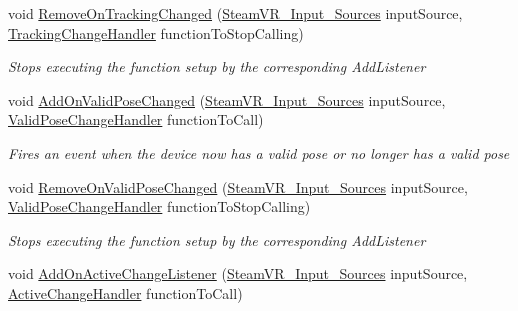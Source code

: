 \begin{DoxyCompactItemize}
void \mbox{\hyperlink{class_valve_1_1_v_r_1_1_steam_v_r___action___pose_a2683c19d679fb0e5ddf4c05ea9f5520e}{Remove\+On\+Tracking\+Changed}} (\mbox{\hyperlink{namespace_valve_1_1_v_r_a82e5bf501cc3aa155444ee3f0662853f}{Steam\+V\+R\+\_\+\+Input\+\_\+\+Sources}} input\+Source, \mbox{\hyperlink{class_valve_1_1_v_r_1_1_steam_v_r___action___pose_a52e352705659c14685cf8a88ef4bafd6}{Tracking\+Change\+Handler}} function\+To\+Stop\+Calling)
\begin{DoxyCompactList}\small\item\em Stops executing the function setup by the corresponding Add\+Listener \end{DoxyCompactList}\item 
void \mbox{\hyperlink{class_valve_1_1_v_r_1_1_steam_v_r___action___pose_a0f4a6917e9c8d7b74c7284c29c6589a8}{Add\+On\+Valid\+Pose\+Changed}} (\mbox{\hyperlink{namespace_valve_1_1_v_r_a82e5bf501cc3aa155444ee3f0662853f}{Steam\+V\+R\+\_\+\+Input\+\_\+\+Sources}} input\+Source, \mbox{\hyperlink{class_valve_1_1_v_r_1_1_steam_v_r___action___pose_a742270a6bddfea2afd7f535378ae7830}{Valid\+Pose\+Change\+Handler}} function\+To\+Call)
\begin{DoxyCompactList}\small\item\em Fires an event when the device now has a valid pose or no longer has a valid pose \end{DoxyCompactList}\item 
void \mbox{\hyperlink{class_valve_1_1_v_r_1_1_steam_v_r___action___pose_a061ef630b883bc7c45f489c7f6cf5ca2}{Remove\+On\+Valid\+Pose\+Changed}} (\mbox{\hyperlink{namespace_valve_1_1_v_r_a82e5bf501cc3aa155444ee3f0662853f}{Steam\+V\+R\+\_\+\+Input\+\_\+\+Sources}} input\+Source, \mbox{\hyperlink{class_valve_1_1_v_r_1_1_steam_v_r___action___pose_a742270a6bddfea2afd7f535378ae7830}{Valid\+Pose\+Change\+Handler}} function\+To\+Stop\+Calling)
\begin{DoxyCompactList}\small\item\em Stops executing the function setup by the corresponding Add\+Listener \end{DoxyCompactList}\item 
void \mbox{\hyperlink{class_valve_1_1_v_r_1_1_steam_v_r___action___pose_a1b947e81f4b7afb3e397d16d753cdb99}{Add\+On\+Active\+Change\+Listener}} (\mbox{\hyperlink{namespace_valve_1_1_v_r_a82e5bf501cc3aa155444ee3f0662853f}{Steam\+V\+R\+\_\+\+Input\+\_\+\+Sources}} input\+Source, \mbox{\hyperlink{class_valve_1_1_v_r_1_1_steam_v_r___action___pose_a3861a4b4b8ce246db2cc77e632a7f999}{Active\+Change\+Handler}} function\+To\+Call)

\end{DoxyCompactItemize}
